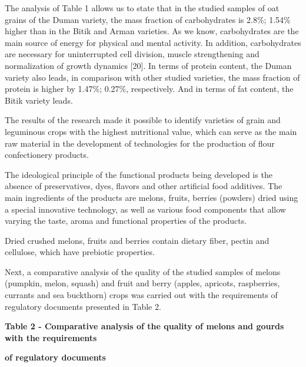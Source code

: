 The analysis of Table 1 allows us to state that in the studied samples
of oat grains of the Duman variety, the mass fraction of carbohydrates
is 2.8\%; 1.54\% higher than in the Bitik and Arman varieties. As we
know, carbohydrates are the main source of energy for physical and
mental activity. In addition, carbohydrates are necessary for
uninterrupted cell division, muscle strengthening and normalization of
growth dynamics {[}20{]}. In terms of protein content, the Duman variety
also leads, in comparison with other studied varieties, the mass
fraction of protein is higher by 1.47\%; 0.27\%, respectively. And in
terms of fat content, the Bitik variety leads.

The results of the research made it possible to identify varieties of
grain and leguminous crops with the highest nutritional value, which can
serve as the main raw material in the development of technologies for
the production of flour confectionery products.

The ideological principle of the functional products being developed is
the absence of preservatives, dyes, flavors and other artificial food
additives. The main ingredients of the products are melons, fruits,
berries (powders) dried using a special innovative technology, as well
as various food components that allow varying the taste, aroma and
functional properties of the products.

Dried crushed melons, fruits and berries contain dietary fiber, pectin
and cellulose, which have prebiotic properties.

Next, a comparative analysis of the quality of the studied samples of
melons (pumpkin, melon, squash) and fruit and berry (apples, apricots,
raspberries, currants and sea buckthorn) crops was carried out with the
requirements of regulatory documents presented in Table 2.

{\bfseries Table 2 - Comparative analysis of the quality of melons and
gourds with the requirements}

{\bfseries of regulatory documents}

